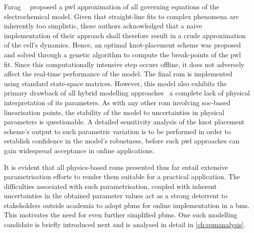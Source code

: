 Farag~\etal{}~\cite{Farag2017}  proposed   a  \gls{pwl}  approximation   of  all
governing equations of the electrochemical  model. Given that straight-line fits
to complex phenomena  are inherently too simplistic,  these authors acknowledged
that a naive implementation of their  approach shall therefore result in a crude
approximation of  the cell's dynamics.  Hence, an optimal  knot-placement scheme
was proposed and solved through a  genetic algorithm to compute the break-points
of the \gls{pwl} fit. Since  this computationally intensive step occurs offline,
it does not  adversely affect the real-time performance of  the model. The final
\gls{rom}  is implemented  using  standard state-space  matrices. However,  this
model  also exhibits  the primary  drawback of  all hybrid  modelling approaches
\ie~a complete lack of physical  interpretation of its parameters. As with any
other \gls{rom} involving \gls{soc}-based linearisation points, the stability of
the model  to uncertainties in  physical parameters is questionable.  A detailed
sensitivity analysis  of the knot  placement scheme's output to  such parametric
variation is  to be performed  in order to  establish confidence in  the model's
robustness, before such  \gls{pwl} approaches can gain  widespread acceptance in
online applications.






It  is evident  that all  physics-based  \glspl{rom} presented  thus far  entail
extensive parametrisation efforts    to render  them suitable for  a practical
application. The difficulties associated with such parametrisation, coupled with
inherent  uncertainties  in  the  obtained  parameter values  act  as  a  strong
deterrent  to stakeholders  outside  academia to  adopt  \glspl{pbm} for  online
implementation  in  a  \gls{bms}.  This  motivates the  need  for  even  further
simplified \glspl{pbm}. One such modelling  candidate is briefly introduced next
and is analysed in detail in \cref{ch:spmanalysis}.


